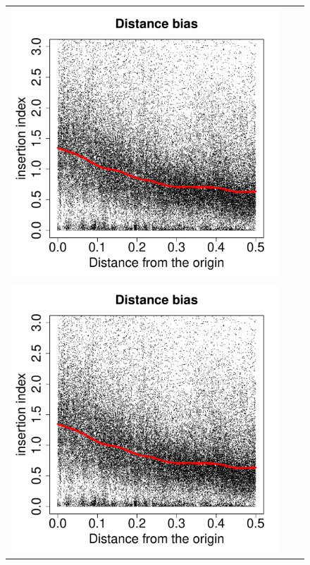 \documentclass[a4paper,10pt, twocolumn]{article}
\begin{document}
\begin{figure}
\begin{tabular}{c c c}
\includegraphics[page=4, scale=0.22]{biases.pdf} \\
\includegraphics[page=5, scale=0.22]{biases.pdf} & 

\end{tabular}
\end{figure}
\end{document}
